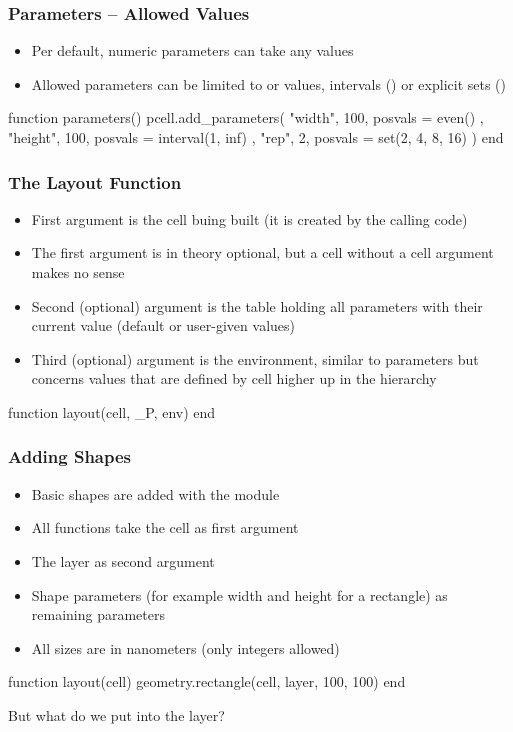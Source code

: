 \documentclass[aspectratio=169, dvipsnames, x11names, svgnames, 11pt]{beamer}
\begin{document}
\begin{frame}[fragile]
    \frametitle{Parameters -- Allowed Values}
    \centering
    \begin{itemize}
        \item Per default, numeric parameters can take any values
        \item Allowed parameters can be limited to  or  values, intervals () or explicit sets ()
    \end{itemize}
    \vfill
    \begin{luacode}
        function parameters()
            pcell.add_parameters({
                { "width", 100, posvals = even() },
                { "height", 100, posvals = interval(1, inf) },
                { "rep", 2, posvals = set(2, 4, 8, 16) }
            })
        end
    \end{luacode}
\end{frame}

\begin{frame}[fragile]
    \frametitle{The Layout Function}
    \centering
    \begin{itemize}
        \item First argument is the cell buing built (it is created by the calling code)
        \item The first argument is in theory optional, but a cell without a cell argument makes no sense
        \item Second (optional) argument is the table holding all parameters with their current value (default or user-given values)
        \item Third (optional) argument is the environment, similar to parameters but concerns values that are defined by cell higher up in the
            hierarchy
    \end{itemize}
    \vfill
    \begin{luacode}
        function layout(cell, _P, env)
        end
    \end{luacode}
\end{frame}

\begin{frame}[fragile]
    \frametitle{Adding Shapes}
    \centering
    \begin{itemize}
        \item Basic shapes are added with the  module
        \item All  functions take the cell as first argument
        \item The layer as second argument
        \item Shape parameters (for example width and height for a rectangle) as remaining parameters
        \item All sizes are in nanometers (only integers allowed)
    \end{itemize}
    \vfill
    \begin{luacode}
        function layout(cell)
            geometry.rectangle(cell, layer, 100, 100)
        end
    \end{luacode}
    \vfill
    But what do we put into the layer?
\end{frame}
\end{document}

